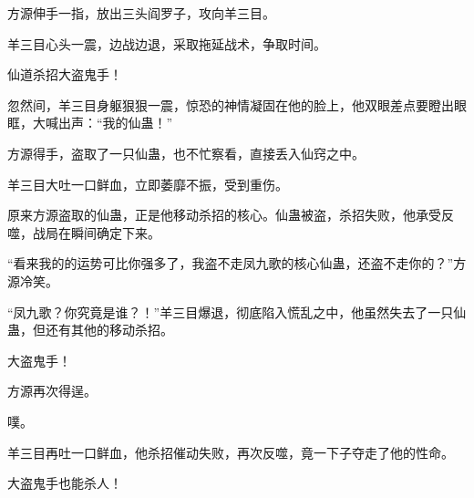 \begin{this_body}
方源伸手一指，放出三头阎罗子，攻向羊三目。

羊三目心头一震，边战边退，采取拖延战术，争取时间。

仙道杀招大盗鬼手！

忽然间，羊三目身躯狠狠一震，惊恐的神情凝固在他的脸上，他双眼差点要瞪出眼眶，大喊出声：“我的仙蛊！”

方源得手，盗取了一只仙蛊，也不忙察看，直接丢入仙窍之中。

羊三目大吐一口鲜血，立即萎靡不振，受到重伤。

原来方源盗取的仙蛊，正是他移动杀招的核心。仙蛊被盗，杀招失败，他承受反噬，战局在瞬间确定下来。

“看来我的的运势可比你强多了，我盗不走凤九歌的核心仙蛊，还盗不走你的？”方源冷笑。

“凤九歌？你究竟是谁？！”羊三目爆退，彻底陷入慌乱之中，他虽然失去了一只仙蛊，但还有其他的移动杀招。

大盗鬼手！

方源再次得逞。

噗。

羊三目再吐一口鲜血，他杀招催动失败，再次反噬，竟一下子夺走了他的性命。

大盗鬼手也能杀人！

\end{this_body}

